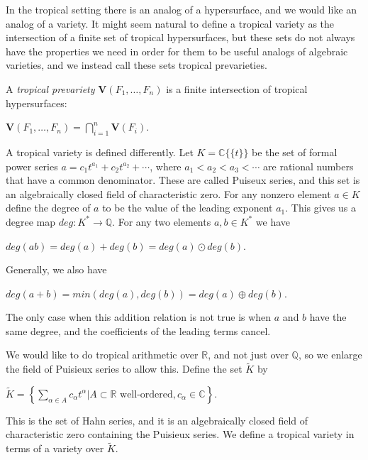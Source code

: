 \documentclass{article}
\begin{document}
In the tropical setting there is an analog of a hypersurface, and we would like an analog of a variety. It might seem natural to define a tropical variety as the intersection of a finite set of tropical hypersurfaces, but these sets do not always have the properties we need in order for them to be useful analogs of algebraic varieties, and we instead call these sets tropical prevarieties. 

A \emph{tropical prevariety} $\textbf{V}(F_{1},\ldots,F_{n})$ is a finite intersection of tropical hypersurfaces:  
\begin{center}
  $\textbf{V}(F_{1},\ldots,F_{n}) = \bigcap_{i = 1}^{n} \textbf{V}(F_{i})$.
\end{center}

A tropical variety is defined differently. Let $K = \mathbb{C}\{\{t\}\}$ be the set of formal power series $a = c_{1}t^{a_{1}} + c_{2}t^{a_{2}} + \cdots$, where $a_{1} < a_{2} < a_{3} < \cdots$ are rational numbers that have a common denominator. These are called Puiseux series, and this set is an algebraically closed field of characteristic zero. For any nonzero element $a \in K$ define the degree of $a$ to be the value of the leading exponent $a_{1}$. This gives us a degree map $deg : K^{*} \rightarrow \mathbb{Q}$. For any two elements $a,b \in K^{*}$ we have
\begin{center}
  $deg(ab) = deg(a) + deg(b) = deg(a) \odot deg(b)$.
\end{center}
Generally, we also have
\begin{center}
  $deg(a + b) = min(deg(a),deg(b)) = deg(a) \oplus deg(b)$.
\end{center}
The only case when this addition relation is not true is when $a$ and $b$ have the same degree, and the coefficients of the leading terms cancel.

We would like to do tropical arithmetic over $\mathbb{R}$, and not just over $\mathbb{Q}$, so we enlarge the field of Puisieux series to allow this. Define the set $\tilde{K}$ by
\begin{center}
  $\tilde{K} = \left\{\sum_{\alpha \in A} c_{\alpha}t^{\alpha} | A \subset \mathbb{R} \text{ well-ordered}, c_{\alpha} \in \mathbb{C}\right\}$.
\end{center}
This is the set of Hahn series, and it is an algebraically closed field of characteristic zero containing the Puisieux series. We define a tropical variety in terms of a variety over $\tilde{K}$.
\end{document}
